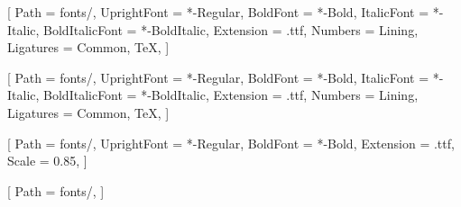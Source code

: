 
\usepackage{fontspec}


\setmainfont{EBGaramond}[
    Path = fonts/,
    UprightFont = *-Regular,
    BoldFont = *-Bold,
    ItalicFont = *-Italic,
    BoldItalicFont = *-BoldItalic,
    Extension = .ttf,
    Numbers = Lining,
    Ligatures = {Common, TeX},
]

\setsansfont{SourceSans3}[
    Path = fonts/,
    UprightFont = *-Regular,
    BoldFont = *-Bold,
    ItalicFont = *-Italic,
    BoldItalicFont = *-BoldItalic,
    Extension = .ttf,
    Numbers = Lining,
    Ligatures = {Common, TeX},
]

\setmonofont{FiraCode}[
    Path = fonts/,
    UprightFont = *-Regular,
    BoldFont = *-Bold,
    Extension = .ttf,
    Scale = 0.85,
]

\usepackage{unicode-math}
[
    Path = fonts/,
]
